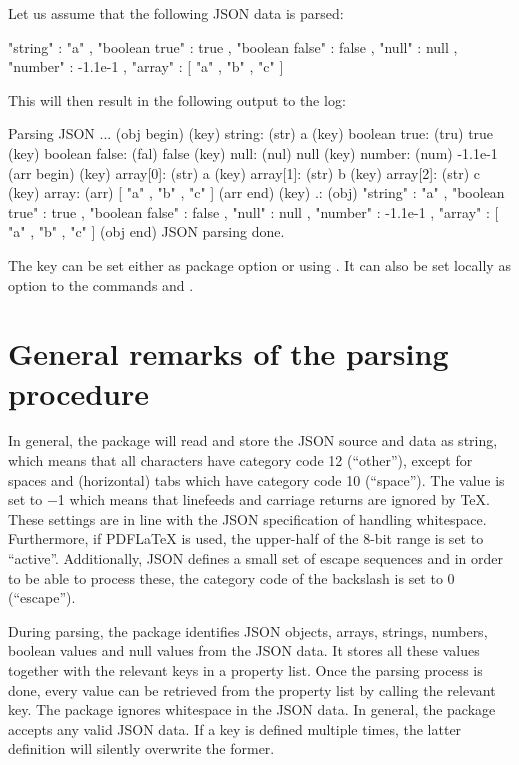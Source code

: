 \documentclass[a4paper]{article}
\begin{document}
Let us assume that the following JSON data is parsed:

\begin{codeexample}
{
  "string" : "a" ,
  "boolean true" : true ,
  "boolean false" : false ,
  "null" : null ,
  "number" : -1.1e-1 ,
  "array" : [ "a" , "b" , "c" ]
}
\end{codeexample}

This will then result in the following output to the log:

\begin{codeexample}
Parsing JSON ...
(obj begin)
(key) string:
  (str) a
(key) boolean true:
  (tru) true
(key) boolean false:
  (fal) false
(key) null:
  (nul) null
(key) number:
  (num) -1.1e-1
(arr begin)
(key) array[0]:
  (str) a
(key) array[1]:
  (str) b
(key) array[2]:
  (str) c
(key) array:
  (arr) [ "a" , "b" , "c" ]
(arr end)
(key) .:
  (obj) { "string" : "a" , "boolean true" : true , "boolean false" :
  false , "null" : null , "number" : -1.1e-1 , "array" : [ "a" ,
  "b" , "c" ] }
(obj end)
JSON parsing done.
\end{codeexample}

The  key can be set either as package option or using \macro{\JSONParseSet}. It can also be set locally as option to the commands \macro{\JSONParse} and \macro{\JSONParseFromFile}.

\section{General remarks of the parsing procedure}\label{sec:general}

In general, the package will read and store the JSON source and data as string, which means that all characters have category code 12 (``other''), except for spaces and (horizontal) tabs which have category code 10 (``space''). The \macro{\endlinechar} value is set to $-$1 which means that linefeeds and carriage returns are ignored by TeX. These settings are in line with the JSON specification of handling whitespace. Furthermore, if PDFLaTeX is used, the upper-half of the 8-bit range is set to ``active''. Additionally, JSON defines a small set of escape sequences and in order to be able to process these, the category code of the backslash is set to 0 (``escape'').

During parsing, the package identifies JSON objects, arrays, strings, numbers, boolean values and null values from the JSON data. It stores all these values together with the relevant keys in a property list. Once the parsing process is done, every value can be retrieved from the property list by calling the relevant key. The package ignores whitespace in the JSON data. In general, the package accepts any valid JSON data. If a key is defined multiple times, the latter definition will silently overwrite the former.
\end{document}
